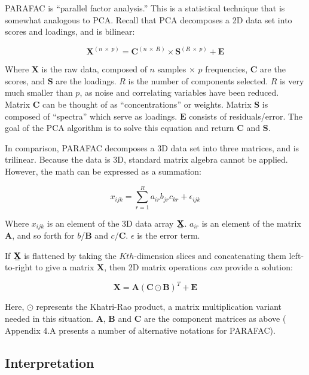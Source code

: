 \documentclass[letter,10pt,twocolumn,twoside,printwatermark=false]{pinp}
\begin{document}
PARAFAC is ``parallel factor analysis.'' This is a statistical technique
that is somewhat analogous to PCA. Recall that PCA decomposes a 2D data
set into scores and loadings, and is bilinear:

\[
\mathbf{X}^{(n \ \times \ p)} = \mathbf{C}^{(n \ \times \ R)} \times \mathbf{S}^{(R \ \times \ p)} + \mathbf{E}
\]

Where \(\mathbf{X}\) is the raw data, composed of \(n\) samples
\(\times\) \(p\) frequencies, \(\mathbf{C}\) are the scores, and
\(\mathbf{S}\) are the loadings. \(R\) is the number of components
selected. \(R\) is very much smaller than \(p\), as noise and
correlating variables have been reduced. Matrix \(\mathbf{C}\) can be
thought of as ``concentrations'' or weights. Matrix \(\mathbf{S}\) is
composed of ``spectra'' which serve as loadings. \(\mathbf{E}\) consists
of residuals/error. The goal of the PCA algorithm is to solve this
equation and return \(\mathbf{C}\) and \(\mathbf{S}\).

In comparison, PARAFAC decomposes a 3D data set into three matrices, and
is trilinear. Because the data is 3D, standard matrix algebra cannot be
applied. However, the math can be expressed as a summation:

\[
x_{ijk} = \sum_{r = 1}^{R} a_{ir}b_{jr}c_{kr} + \epsilon_{ijk}
\]

Where \(x_{ijk}\) is an element of the 3D data array
\(\stackunder[1.2pt]{$\mathbf{X}$}{\rule{1.2ex}{.075ex}}\). \(a_{ir}\)
is an element of the matrix \(\mathbf{A}\), and so forth for
\(b\)/\(\mathbf{B}\) and \(c\)/\(\mathbf{C}\). \(\epsilon\) is the error
term.

If \(\stackunder[1.2pt]{$\mathbf{X}$}{\rule{1.2ex}{.075ex}}\) is
flattened by taking the \(Kth\)-dimension slices and concatenating them
left-to-right to give a matrix \(\mathbf{X}\), then 2D matrix operations
\emph{can} provide a solution:

\[
\mathbf{X} = \mathbf{A}(\mathbf{C} \odot \mathbf{B})^T + \mathbf{E}
\]

Here, \(\odot\) represents the Khatri-Rao product, a matrix
multiplication variant needed in this situation. \(\mathbf{A}\),
\(\mathbf{B}\) and \(\mathbf{C}\) are the component matrices as above
(\cite{Bro2003b, Smilde2004} Appendix 4.A presents a number of
alternative notations for PARAFAC).

\hypertarget{interpretation}{%
\subsection{Interpretation}\label{interpretation}}
\end{document}
